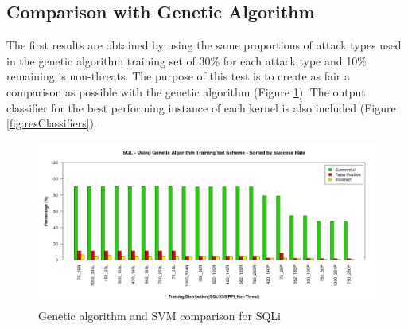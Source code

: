 \newpage
\subsection{Comparison with Genetic Algorithm} \label{sec:resComparison}

The first results are obtained by using the same proportions of attack types used in the genetic algorithm training set of 30\% for each attack type and 10\% remaining is non-threats. The purpose of this test is to create as fair a comparison as possible with the genetic algorithm (Figure \ref{fig:resComparison}).  The output classifier for the best performing instance of each kernel is also included (Figure \ref{fig:resClassifiers}).

\begin{figure}[hb]
	\centering
	\includegraphics[width=450px]{./assets/results/svm/comparison/Results_SQL.png}
	\caption{Genetic algorithm and SVM comparison for SQLi}
	\label{fig:resComparison}
\end{figure}

